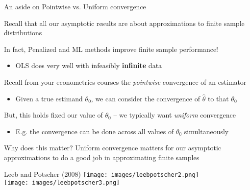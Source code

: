 \documentclass[notes,11pt, aspectratio=169]{beamer}
\newenvironment{wideitemize}{\itemize\addtolength{\itemsep}{10pt}}{\enditemize}
\begin{document}
\begin{frame}{An aside on Pointwise vs. Uniform convergence}
  \begin{wideitemize}
    \item Recall that all our asymptotic results are about approximations to finite sample distributions
    \item In fact, Penalized and ML methods improve finite sample performance!
      \begin{itemize}
      \item OLS does very well with infeasibly \textbf{infinite} data
      \end{itemize}
    \item Recall from your econometrics courses the
      \emph{pointwise} convergence of an estimator
      \begin{itemize}
      \item Given a true estimand $\theta_{0}$, we can consider the
        convergence of $\hat{\theta}$ to that $\theta_{0}$
      \end{itemize}
    \item But, this holds fixed our value of $\theta_{0}$ -- we
      typically want \emph{uniform} convergence
      \begin{itemize}
      \item E.g. the convergence can be done across all values of
        $\theta_{0}$ simultaneously
      \end{itemize}
    \item Why does this matter? Uniform convergence matters for
      our asymptotic approximations to do a good job in approximating
      finite samples
  \end{wideitemize}
\end{frame}

\begin{frame}{Leeb and Potscher (2008)}
  \texttt{[image: images/leebpotscher2.png]}\\
  \texttt{[image: images/leebpotscher3.png]}
\end{frame}
\end{document}
